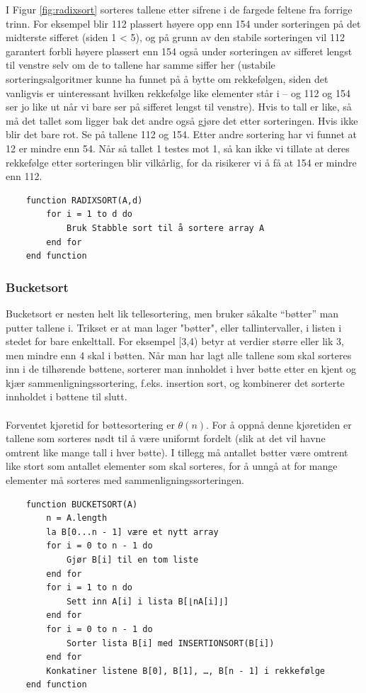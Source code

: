 \noindent I Figur \ref{fig:radixsort} sorteres tallene etter sifrene i de fargede feltene fra forrige trinn. For eksempel blir 112 plassert høyere opp enn 154 under sorteringen på det midterste sifferet (siden 1 < 5), og på grunn av den stabile sorteringen vil 112 garantert forbli høyere plassert enn 154 også under sorteringen av sifferet lengst til venstre selv om de to tallene har samme siffer her (ustabile sorteringsalgoritmer kunne ha funnet på å bytte om rekkefølgen, siden det vanligvis er uinteressant hvilken rekkefølge like elementer står i – og 112 og 154 ser jo like ut når vi bare ser på sifferet lengst til venstre). Hvis to tall er like, så må det tallet som ligger bak det andre også gjøre det etter sorteringen. Hvis ikke blir det bare rot. Se på tallene 112 og 154. Etter andre sortering har vi funnet at 12 er mindre enn 54. Når så tallet 1 testes mot 1, så kan ikke vi tillate at deres rekkefølge etter sorteringen blir vilkårlig, for da risikerer vi å få at 154 er mindre enn 112.

\begin{lstlisting}
    function RADIXSORT(A,d)
    	for i = 1 to d do
    		Bruk Stabble sort til å sortere array A
    	end for
    end function
\end{lstlisting}

\subsubsection{Bucketsort}
Bucketsort er nesten helt lik tellesortering, men bruker såkalte “bøtter” man putter tallene i. Trikset er at man lager "bøtter", eller tallintervaller, i listen i stedet for bare enkelttall. For eksempel [3,4) betyr at verdier større eller lik 3, men mindre enn 4 skal i bøtten. Når man har lagt alle tallene som skal sorteres inn i de tilhørende bøttene, sorterer man innholdet i hver bøtte etter en kjent og kjær sammenligningssortering, f.eks. insertion sort, og kombinerer det sorterte innholdet i bøttene til slutt.
\\\\
Forventet kjøretid for bøttesortering er $\theta(n)$. For å oppnå denne kjøretiden er tallene som sorteres nødt til å være uniformt fordelt (slik at det vil havne omtrent like mange tall i hver bøtte). I tillegg må antallet bøtter være omtrent like stort som antallet elementer som skal sorteres, for å unngå at for mange elementer må sorteres med sammenligningssorteringen.

\begin{lstlisting}
    function BUCKETSORT(A)
	    n = A.length
	    la B[0...n - 1] være et nytt array
	    for i = 0 to n - 1 do
	    	Gjør B[i] til en tom liste
	    end for
	    for i = 1 to n do
    		Sett inn A[i] i lista B[⌊nA[i]⌋]
    	end for
	    for i = 0 to n - 1 do
		    Sorter lista B[i] med INSERTIONSORT(B[i])
	    end for
	    Konkatiner listene B[0], B[1], …, B[n - 1] i rekkefølge
    end function
\end{lstlisting}


